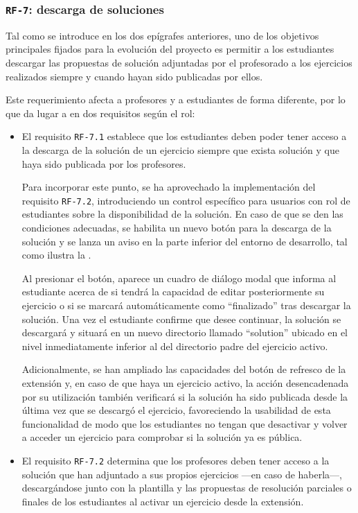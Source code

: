 \subsubsection{\texttt{RF-7}: descarga de soluciones}
\label{subsec:rf7}

Tal como se introduce en los dos epígrafes anteriores, uno de los objetivos principales fijados para la evolución del proyecto es permitir a los estudiantes descargar las propuestas de solución adjuntadas por el profesorado a los ejercicios realizados siempre y cuando hayan sido publicadas por ellos.

Este requerimiento afecta a profesores y a estudiantes de forma diferente, por lo que da lugar a en dos requisitos según el rol:
\begin{itemize}
    \item El requisito \texttt{RF-7.1} establece que los estudiantes deben poder tener acceso a la descarga de la solución de un ejercicio siempre que exista solución y que haya sido publicada por los profesores.
    
    Para incorporar este punto, se ha aprovechado la implementación del requisito \texttt{RF-7.2}, introduciendo un control específico para usuarios con rol de estudiantes sobre la disponibilidad de la solución. En caso de que se den las condiciones adecuadas, se habilita un nuevo botón para la descarga de la solución y se lanza un aviso en la parte inferior del entorno de desarrollo, tal como ilustra la .

    Al presionar el botón, aparece un cuadro de diálogo modal que informa al estudiante acerca de si tendrá la capacidad de editar posteriormente su ejercicio o si se marcará automáticamente como ``finalizado'' tras descargar la solución. Una vez el estudiante confirme que desee continuar, la solución se descargará y situará en un nuevo directorio llamado ``solution'' ubicado en el nivel inmediatamente inferior al del directorio padre del ejercicio activo.

    Adicionalmente, se han ampliado las capacidades del botón de refresco de la extensión y, en caso de que haya un ejercicio activo, la acción desencadenada por su utilización también verificará si la solución ha sido publicada desde la última vez que se descargó el ejercicio, favoreciendo la usabilidad de esta funcionalidad de modo que los estudiantes no tengan que desactivar y volver a acceder un ejercicio para comprobar si la solución ya es pública.
    \item El requisito \texttt{RF-7.2} determina que los profesores deben tener acceso a la solución que han adjuntado a sus propios ejercicios ---en caso de haberla---, descargándose junto con la plantilla y las propuestas de resolución parciales o finales de los estudiantes al activar un ejercicio desde la extensión.
    

\end{itemize}
